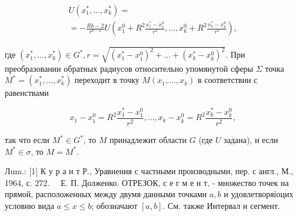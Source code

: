 \documentclass[10pt]{article}
\begin{document}
\[

\begin{gathered}

U\left(x_{1}^{*}, \ldots, x_{k}^{*}\right)= \\

=-\frac{R k-2}{r^{k-2}} U\left(x_{1}^{0}+R^{2} \frac{x_{1}^{*}-x_{1}^{0}}{r^{2}}, \ldots, x_{k}^{0}+R^{2} \frac{x_{k}^{*}-x_{k}^{0}}{r^{2}}\right),

\end{gathered}

\]



где $\left(x_{1}^{*}, \ldots, x_{k}^{*}\right) \in G^{*}, r=\sqrt{\left(x_{1}^{*}-x_{1}^{0}\right)^{2}+\ldots+\left(x_{k}^{*}-x_{k}^{0}\right)^{2}}$. При преобразовании обратных радиусов относительно упомянутой сферы $\Sigma$ точка $M^{*}=\left(x_{1}^{*}, \ldots, x_{k}^{*}\right)$ переходит в точку $M\left(x_{1}, \ldots, x_{k}\right)$ в соответствии с равенствами



\[

x_{1}-x_{1}^{0}=R^{2} \frac{x_{1}^{*}-x_{1}^{0}}{r^{2}}, \ldots, x_{k}-x_{k}^{0}=R^{2} \frac{x_{k}^{*}-x_{k}^{0}}{r^{2}},

\]



так что если $M^{*} \in G^{*}$, то $M$ принадлежит области $G$ (где $U$ задана), и если $M^{*} \in \sigma$, то $M=M^{*}$.



Лum.: [1] К у р а н т Р., Уравнения с частными производными, пер. с англ., М., 1964, с. $272 . \quad$ Е. П. Долженко. ОТРЕЗОК, с е г м е н т, - множество точек на прямой, расположенных между двумя данными точками $a, b$ и удовлетворяіоцих условию вида $a \leqslant x \leqslant b$; обозначают $[a, b]$. См. также Интервал и сегмент.
\end{document}
